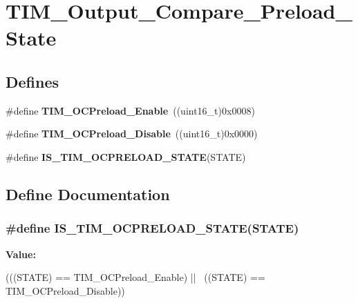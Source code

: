 \hypertarget{group__TIM__Output__Compare__Preload__State}{
\section{TIM\_\-Output\_\-Compare\_\-Preload\_\-State}
\label{group__TIM__Output__Compare__Preload__State}
}
\subsection*{Defines}
\begin{DoxyCompactItemize}
\item 
\hypertarget{group__TIM__Output__Compare__Preload__State_gad647db2e7a89bd6db3c787680afccf8f}{
\#define {\bfseries TIM\_\-OCPreload\_\-Enable}~((uint16\_\-t)0x0008)}
\label{group__TIM__Output__Compare__Preload__State_gad647db2e7a89bd6db3c787680afccf8f}

\item 
\hypertarget{group__TIM__Output__Compare__Preload__State_ga0cbcc3c4d90d61d85550db2173737ed6}{
\#define {\bfseries TIM\_\-OCPreload\_\-Disable}~((uint16\_\-t)0x0000)}
\label{group__TIM__Output__Compare__Preload__State_ga0cbcc3c4d90d61d85550db2173737ed6}

\item 
\#define {\bfseries IS\_\-TIM\_\-OCPRELOAD\_\-STATE}(STATE)
\end{DoxyCompactItemize}


\subsection{Define Documentation}
\hypertarget{group__TIM__Output__Compare__Preload__State_ga48cc07c5e87b5fd7549b7668f1598ab5}{
\subsubsection[{IS\_\-TIM\_\-OCPRELOAD\_\-STATE}]{\setlength{\rightskip}{0pt plus 5cm}\#define IS\_\-TIM\_\-OCPRELOAD\_\-STATE(STATE)}}
\label{group__TIM__Output__Compare__Preload__State_ga48cc07c5e87b5fd7549b7668f1598ab5}
{\bfseries Value:}
\begin{DoxyCode}
(((STATE) == TIM_OCPreload_Enable) || \
                                       ((STATE) == TIM_OCPreload_Disable))
\end{DoxyCode}
